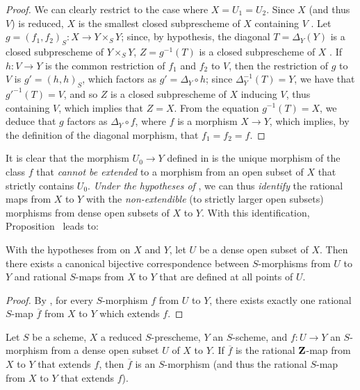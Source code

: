 \begin{proof}
\label{proof-1.7.2.2.1}
We can clearly restrict to the case where $X=U_1=U_2$.
Since $X$ (and thus $V$) is reduced, $X$ is the smallest closed subprescheme of $X$ containing $V$ .
Let $g=(f_1,f_2)_S:X\to Y\times_S Y$; since, by hypothesis, the diagonal $T=\Delta_Y(Y)$ is a closed subprescheme of $Y\times_S Y$, $Z=g^{-1}(T)$ is a closed subprescheme of $X$ .
If $h:V\to Y$ is the common restriction of $f_1$ and $f_2$ to $V$, then the restriction of $g$ to $V$ is $g'=(h,h)_S$, which factors as $g'=\Delta_Y\circ h$; since $\Delta_Y^{-1}(T)=Y$, we have that $g'^{-1}(T)=V$, and so $Z$ is a closed subprescheme of $X$ inducing $V$, thus containing $V$, which implies that $Z=X$.
From the equation $g^{-1}(T)=X$, we deduce  that $g$ factors as $\Delta_Y\circ f$, where $f$ is a morphism $X\to Y$, which implies, by the definition of the diagonal morphism, that $f_1=f_2=f$.
\end{proof}

It is clear that the morphism $U_0\to Y$ defined in  is the unique morphism of the class $f$ that \emph{cannot be extended} to a morphism from an open subset of $X$ that strictly contains $U_0$.
\emph{Under the hypotheses of }, we can thus \emph{identify} the rational maps from $X$ to $Y$ with the \emph{non-extendible} (to strictly larger open subsets) morphisms from dense open subsets of $X$ to $Y$.
With this identification, Proposition~ leads to:

\begin{cor}[7.2.3]
\label{1.7.2.3}
With the hypotheses from  on $X$ and $Y$, let $U$ be a dense open subset of $X$.
Then there exists a canonical bijective correspondence between $S$-morphisms from $U$ to $Y$ and rational $S$-maps from $X$ to $Y$ that are defined at all points of $U$.
\end{cor}

\begin{proof}
\label{proof-1.7.2.3}
By , for every $S$-morphism $f$ from $U$ to $Y$, there exists exactly one rational $S$-map $\overline{f}$ from $X$ to $Y$ which extends $f$.
\end{proof}

\begin{cor}[7.2.4]
\label{1.7.2.4}
Let $S$ be a scheme, $X$ a reduced $S$-prescheme, $Y$ an $S$-scheme, and $f:U\to Y$ an $S$-morphism from a dense open subset $U$ of $X$ to $Y$.
If $\overline{f}$ is the rational $\mathbf{Z}$-map from $X$ to $Y$ that extends $f$, then $\overline{f}$ is an $S$-morphism (and thus the rational $S$-map from $X$ to $Y$ that extends $f$).
\end{cor}

